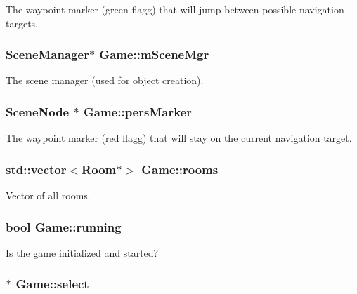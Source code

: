 \-The waypoint marker (green flagg) that will jump between possible navigation targets. \hypertarget{classGame_a5f59202a5d81c57c0f1c8f8c717067ff}{
\subsubsection[{m\-Scene\-Mgr}]{\setlength{\rightskip}{0pt plus 5cm}\-Scene\-Manager$\ast$ {\bf \-Game\-::m\-Scene\-Mgr}}}\label{classGame_a5f59202a5d81c57c0f1c8f8c717067ff}
\-The scene manager (used for object creation). \hypertarget{classGame_a01b72d441b419041c80ba13b17ccd1a3}{
\subsubsection[{pers\-Marker}]{\setlength{\rightskip}{0pt plus 5cm}\-Scene\-Node $\ast$ {\bf \-Game\-::pers\-Marker}}}\label{classGame_a01b72d441b419041c80ba13b17ccd1a3}
\-The waypoint marker (red flagg) that will stay on the current navigation target. \hypertarget{classGame_a2224f48ac11275212f97d0bfad0aa5d0}{
\subsubsection[{rooms}]{\setlength{\rightskip}{0pt plus 5cm}std\-::vector$<${\bf \-Room}$\ast$$>$ {\bf \-Game\-::rooms}}}\label{classGame_a2224f48ac11275212f97d0bfad0aa5d0}
\-Vector of all rooms. \hypertarget{classGame_a8ca5b9f8a62990e6022de17785beac2c}{
\subsubsection[{running}]{\setlength{\rightskip}{0pt plus 5cm}bool {\bf \-Game\-::running}}}\label{classGame_a8ca5b9f8a62990e6022de17785beac2c}
\-Is the game initialized and started? \hypertarget{classGame_ab249da316eee71f550d2cb8962c1525f}{
\subsubsection[{select}]{$\ast$ {\bf \-Game\-::select}}}\label{classGame_ab249da316eee71f550d2cb8962c1525f}
